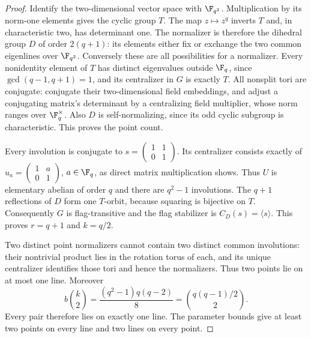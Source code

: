 \begin{proof}
Identify the two-dimensional vector space with $\F_{q^2}$. Multiplication
by its norm-one elements gives the cyclic group $T$. The map $z\mapsto z^q$
inverts $T$ and, in characteristic two, has determinant one. The normalizer
is therefore the dihedral group $D$ of order $2(q+1)$: its elements either
fix or exchange the two common eigenlines over $\F_{q^2}$. Conversely these
are all possibilities for a normalizer. Every nonidentity element of $T$
has distinct eigenvalues outside $\F_q$, since
$\gcd(q-1,q+1)=1$, and its centralizer in $G$ is exactly $T$.
All nonsplit tori are conjugate: conjugate their two-dimensional field
embeddings, and adjust a conjugating matrix's determinant by a centralizing
field multiplier, whose norm ranges over $\F_q^\times$. Also $D$ is
self-normalizing, since its odd cyclic subgroup is characteristic.
This proves the point count.

Every involution is conjugate to
$s=\left(\begin{smallmatrix}1&1\\0&1\end{smallmatrix}\right)$.
Its centralizer consists exactly of
$u_a=\left(\begin{smallmatrix}1&a\\0&1\end{smallmatrix}\right)$,
$a\in\F_q$, as direct matrix multiplication shows. Thus $U$ is elementary
abelian of order $q$ and there are $q^2-1$ involutions. The $q+1$ reflections
of $D$ form one $T$-orbit, because squaring is bijective on $T$.
Consequently $G$ is flag-transitive and the flag stabilizer is
$C_D(s)=\langle s\rangle$. This proves $r=q+1$ and $k=q/2$.

Two distinct point normalizers cannot contain two distinct common
involutions: their nontrivial product lies in the rotation torus of each,
and its unique centralizer identifies those tori and hence the normalizers.
Thus two points lie on at most one line. Moreover
\[
 b\binom{k}{2}=\frac{(q^2-1)q(q-2)}8
             =\binom{q(q-1)/2}{2}.
\]
Every pair therefore lies on exactly one line. The parameter bounds give
at least two points on every line and two lines on every point.
\end{proof}

